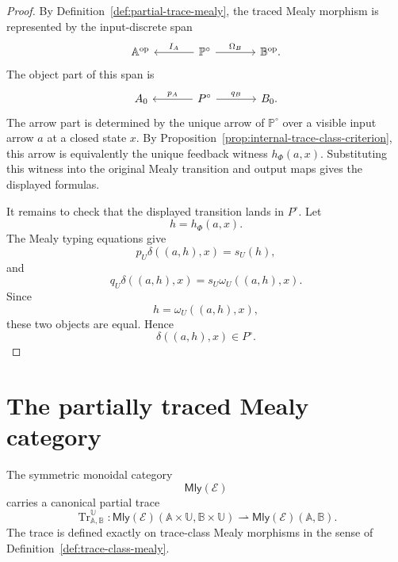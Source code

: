 \begin{proof}
By Definition~\ref{def:partial-trace-mealy}, the traced Mealy morphism is
represented by the input-discrete span
\[
\begin{tikzcd}[column sep=large]
\mathbb A^{\mathrm{op}}
&
\mathbb P^\circ
  \arrow[l, "I_A"']
  \arrow[r, "\Omega_B"]
&
\mathbb B^{\mathrm{op}} .
\end{tikzcd}
\]
The object part of this span is
\[
\begin{tikzcd}[column sep=large]
A_0
&
P^\circ
  \arrow[l, "p_A"']
  \arrow[r, "q_B"]
&
B_0 .
\end{tikzcd}
\]
The arrow part is determined by the unique arrow of \(\mathbb P^\circ\) over a
visible input arrow \(a\) at a closed state \(x\).  By
Proposition~\ref{prop:internal-trace-class-criterion}, this arrow is
equivalently the unique feedback witness \(h_\Phi(a,x)\).  Substituting this
witness into the original Mealy transition and output maps gives the displayed
formulas.

It remains to check that the displayed transition lands in \(P^\circ\).  Let
\[
h=h_\Phi(a,x).
\]
The Mealy typing equations give
\[
p_U\delta((a,h),x)=s_U(h),
\]
and
\[
q_U\delta((a,h),x)=s_U\omega_U((a,h),x).
\]
Since
\[
h=\omega_U((a,h),x),
\]
these two objects are equal.  Hence
\[
\delta((a,h),x)\in P^\circ.
\]
\end{proof}

\section{The partially traced Mealy category}
\label{sec:partially-traced-mealy-category}

\begin{theorem}
\label{thm:partial-trace-on-mealy}
The symmetric monoidal category
\[
\mathsf{Mly}(\mathcal E)
\]
carries a canonical partial trace
\[
\operatorname{Tr}^{\mathbb U}_{\mathbb A,\mathbb B}:
\mathsf{Mly}(\mathcal E)(\mathbb A\times\mathbb U,\mathbb B\times\mathbb U)
\rightharpoonup
\mathsf{Mly}(\mathcal E)(\mathbb A,\mathbb B).
\]
The trace is defined exactly on trace-class Mealy morphisms in the sense of
Definition~\ref{def:trace-class-mealy}.
\end{theorem}

